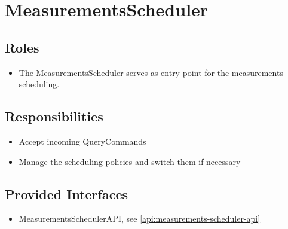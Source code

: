 \section{MeasurementsScheduler}
\label{element:measurements-scheduler}

\subsection{Roles}
\begin{itemize}
    \item The MeasurementsScheduler serves as entry point for the
    measurements scheduling.
\end{itemize}

\subsection{Responsibilities}
\begin{itemize}
    \item Accept incoming QueryCommands
    \item Manage the scheduling policies and switch them if necessary
\end{itemize}

\subsection{Provided Interfaces}
\begin{itemize}
    \item MeasurementsSchedulerAPI, see \ref{api:measurements-scheduler-api}
\end{itemize}